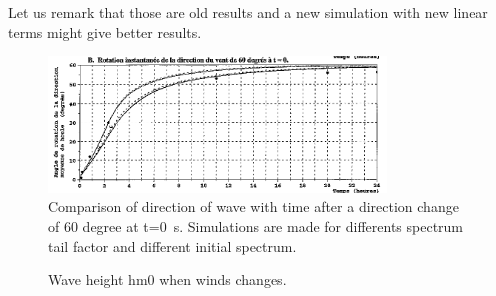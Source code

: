 Let us remark that those are old results and a new simulation with new linear
terms might give better results.

\begin{figure} [!h]
\centering
\includegraphics[width=0.8\textwidth]{resuTW60.png}
\caption{Comparison of direction of wave with time after a direction change of
  60 degree at t=0~s. Simulations are made for differents spectrum tail factor
  and different initial spectrum.}
\label{resturnwind}
\end{figure}

\begin{figure} [!h]
\centering
{}
 \caption{Wave height hm0 when winds changes.}
\label{resturningwind}
\end{figure}
